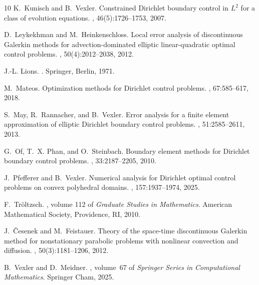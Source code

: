 \documentclass[a4paper,10pt]{article}
\numberwithin{theorem}{section}
\begin{document}
\begin{thebibliography}{10}
K.~Kunisch and B.~Vexler.
\newblock Constrained {D}irichlet boundary control in ${L}^2$ for a class of
  evolution equations.
, 46(5):1726--1753, 2007.

D.~Leykekhman and M.~Heinkenschloss.
\newblock Local error analysis of discontinuous {G}alerkin methods for
  advection-dominated elliptic linear-quadratic optimal control problems.
, 50(4):2012--2038, 2012.

J.-L. Lions.
.
\newblock Springer, Berlin, 1971.

M.~Mateos.
\newblock Optimization methods for {D}irichlet control problems.
, 67:585--617, 2018.

S.~May, R.~Rannacher, and B.~Vexler.
\newblock Error analysis for a finite element approximation of elliptic
  {D}irichlet boundary control problems.
, 51:2585--2611, 2013.

G.~Of, T.~X. Phan, and O.~Steinbach.
\newblock Boundary element methods for {D}irichlet boundary control problems.
, 33:2187--2205, 2010.

J.~Pfefferer and B.~Vexler.
\newblock Numerical analysis for {D}irichlet optimal control problems on convex
  polyhedral domains.
, 157:1937--1974, 2025.

F.~Tr{\"o}ltzsch.
, volume 112 of {\em Graduate Studies in
  Mathematics}.
\newblock American Mathematical Society, Providence, RI, 2010.

J.~\v{C}esenek and M.~Feistauer.
\newblock Theory of the space-time discontinuous {G}alerkin method for
  nonstationary parabolic problems with nonlinear convection and diffusion.
, 50(3):1181--1206, 2012.

B.~Vexler and D.~Meidner.
,
  volume~67 of {\em Springer Series in Computational Mathematics}.
\newblock Springer Cham, 2025.


\end{thebibliography}
\end{document}
